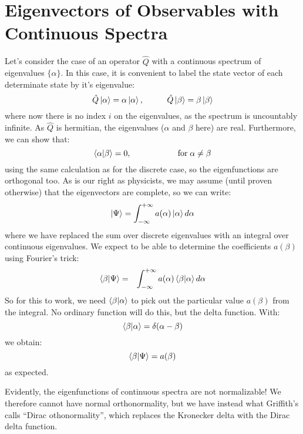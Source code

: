 \documentclass[12pt]{book}
\begin{document}
\section{Eigenvectors of Observables with Continuous Spectra}

Let's consider the case of an operator $\hat{Q}$ with a continuous spectrum of eigenvalues $\{\alpha\}$.  In this case, it is convenient to label the state vector of each determinate state by it's eigenvalue:
$$\hat{Q}\ket{\alpha} = \alpha \ket{\alpha}, \hspace{1cm} \hat{Q}\ket{\beta} = \beta \ket{\beta}$$
where now there is no index $i$ on the eigenvalues, as the spectrum is uncountably infinite.  As $\hat{Q}$ is hermitian, the eigenvalues ($\alpha$ and $\beta$ here) are real.  Furthermore, we can show that:
$$\braket{\alpha|\beta} = 0, \hspace{2cm} {\rm for} \;\alpha \neq \beta$$ 
using the same calculation as for the discrete case, so the eigenfunctions are orthogonal too.  As is our right as physicists, we may assume (until proven otherwise) that the eigenvectors are complete, so we can write:
$$\ket{\Psi} = \int_{-\infty}^{+\infty} a(\alpha) \ket{\alpha}d\alpha$$
where we have replaced the sum over discrete eigenvalues with an integral over continuous eigenvalues.
We expect to be able to determine the coefficients $a(\beta)$ using Fourier's trick:
\begin{eqnarray*}
\braket{\beta|\Psi} &=& \int_{-\infty}^{+\infty} a(\alpha) \braket{\beta | \alpha} d\alpha \\
\end{eqnarray*}
So for this to work, we need $\braket{\beta | \alpha}$ to pick out the particular value $a(\beta)$ from the integral.  No ordinary function will do this, but the delta function.  With:
$$\braket{\beta|\alpha} = \delta(\alpha-\beta)$$
we obtain:
$$\braket{\beta|\Psi} = a(\beta)$$
as expected.

Evidently, the eigenfunctions of continuous spectra are not normalizable!  We therefore cannot have normal orthonormality, but we have instead what Griffith's calls ``Dirac othonormality'', which replaces the Kronecker delta with the Dirac delta function.\\ 
\end{document}
